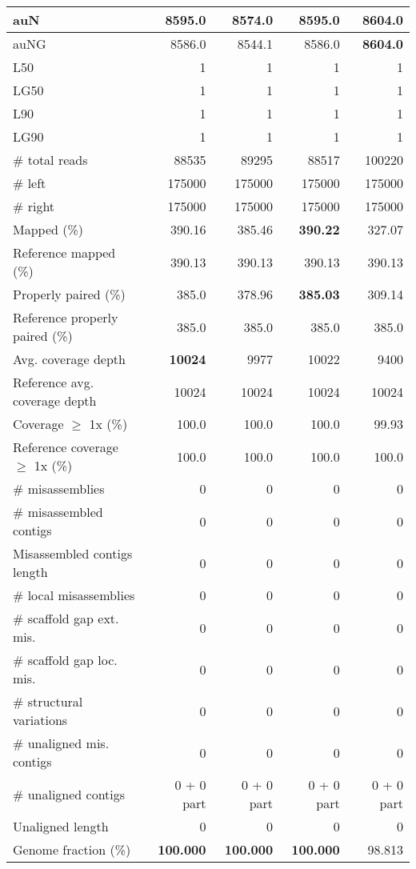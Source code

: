 \documentclass[12pt,a4paper]{article}
\begin{document}
\begin{table}[ht]
\begin{center}
\begin{tabular}{|l*{4}{|r}|}
auN & 8595.0 & 8574.0 & 8595.0 & {\bf 8604.0} \\ \hline
auNG & 8586.0 & 8544.1 & 8586.0 & {\bf 8604.0} \\ \hline
L50 & 1 & 1 & 1 & 1 \\ \hline
LG50 & 1 & 1 & 1 & 1 \\ \hline
L90 & 1 & 1 & 1 & 1 \\ \hline
LG90 & 1 & 1 & 1 & 1 \\ \hline
\# total reads & 88535 & 89295 & 88517 & 100220 \\ \hline
\# left & 175000 & 175000 & 175000 & 175000 \\ \hline
\# right & 175000 & 175000 & 175000 & 175000 \\ \hline
Mapped (\%) & 390.16 & 385.46 & {\bf 390.22} & 327.07 \\ \hline
Reference mapped (\%) & 390.13 & 390.13 & 390.13 & 390.13 \\ \hline
Properly paired (\%) & 385.0 & 378.96 & {\bf 385.03} & 309.14 \\ \hline
Reference properly paired (\%) & 385.0 & 385.0 & 385.0 & 385.0 \\ \hline
Avg. coverage depth & {\bf 10024} & 9977 & 10022 & 9400 \\ \hline
Reference avg. coverage depth & 10024 & 10024 & 10024 & 10024 \\ \hline
Coverage $\geq$ 1x (\%) & 100.0 & 100.0 & 100.0 & 99.93 \\ \hline
Reference coverage $\geq$ 1x (\%) & 100.0 & 100.0 & 100.0 & 100.0 \\ \hline
\# misassemblies & 0 & 0 & 0 & 0 \\ \hline
\# misassembled contigs & 0 & 0 & 0 & 0 \\ \hline
Misassembled contigs length & 0 & 0 & 0 & 0 \\ \hline
\# local misassemblies & 0 & 0 & 0 & 0 \\ \hline
\# scaffold gap ext. mis. & 0 & 0 & 0 & 0 \\ \hline
\# scaffold gap loc. mis. & 0 & 0 & 0 & 0 \\ \hline
\# structural variations & 0 & 0 & 0 & 0 \\ \hline
\# unaligned mis. contigs & 0 & 0 & 0 & 0 \\ \hline
\# unaligned contigs & 0 + 0 part & 0 + 0 part & 0 + 0 part & 0 + 0 part \\ \hline
Unaligned length & 0 & 0 & 0 & 0 \\ \hline
Genome fraction (\%) & {\bf 100.000} & {\bf 100.000} & {\bf 100.000} & 98.813 \\ \hline

\end{tabular}
\end{center}
\end{table}
\end{document}
